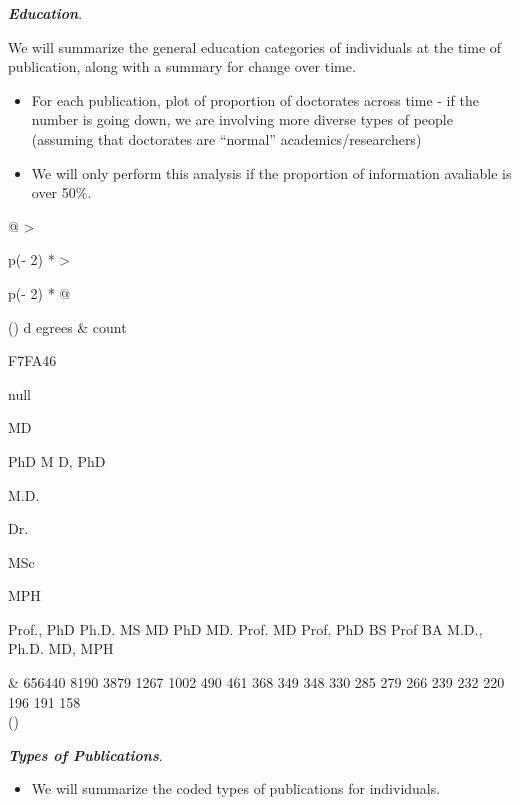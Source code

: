 \documentclass[
  man]{apa7}
\newenvironment{Shaded}{\begin{snugshade}}{\end{snugshade}}
\newcommand{\NormalTok}[1]{#1}
\providecommand{\tightlist}{%
  \setlength{\itemsep}{0pt}\setlength{\parskip}{0pt}}
\begin{document}
\textbf{\emph{Education}}.

We will summarize the general education categories of individuals at the
time of publication, along with a summary for change over time.

\begin{itemize}
\tightlist
\item
  For each publication, plot of proportion of doctorates across time - if the number is going down, we are involving more diverse types of people (assuming that doctorates are ``normal'' academics/researchers)
\item
  We will only perform this analysis if the proportion of information avaliable is over 50\%.
\end{itemize}

\begin{longtable}[]{@{}
  >{\raggedright\arraybackslash}p{(\columnwidth - 2\tabcolsep) * }
  >{\raggedright\arraybackslash}p{(\columnwidth - 2\tabcolsep) * }@{}}
\toprule()
\endhead
d
egrees & count \\
\begin{minipage}[t]{\linewidth}\raggedright
\begin{Shaded}
\begin{Highlighting}[]
\NormalTok{F7FA46}

\NormalTok{  null}

\NormalTok{    MD}

\NormalTok{   PhD}
\NormalTok{M}
\NormalTok{D, PhD}

\NormalTok{  M.D.}

\NormalTok{   Dr.}

\NormalTok{   MSc}

\NormalTok{   MPH}
\end{Highlighting}
\end{Shaded}

Prof.,
PhD
Ph.D.
MS MD
PhD
MD.
Prof.
MD
Prof.
PhD BS
Prof
BA
M.D.,
Ph.D.
MD,
MPH
\end{minipage} & 656440
8190
3879
1267
1002
490
461
368
349
348
330
285
279
266
239
232
220
196
191
158 \\
\bottomrule()
\end{longtable}

\textbf{\emph{Types of Publications}}.

\begin{itemize}
\tightlist
\item
  We will summarize the coded types of publications for individuals.
\end{itemize}
\end{document}
